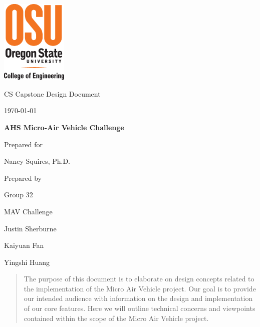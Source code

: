 \documentclass[onecolumn, draftclsnofoot,10pt, compsoc]{IEEEtran}
\def \CapstoneTeamName{		MAV Challenge}
\def \CapstoneTeamNumber{		32}
\def \GroupMemberOne{			Justin Sherburne}
\def \GroupMemberTwo{			Kaiyuan Fan}
\def \GroupMemberThree{			Yingshi Huang}
\def \CapstoneProjectName{		AHS Micro-Air Vehicle Challenge}
\def \CapstoneSponsorPerson{		Nancy Squires, Ph.D.}
\def \DocType{		%
				Design Document
				}
\newcommand{\NameSigPair}[1]{\par
\makebox[2.75in][r]{#1} \hfil 	\makebox[3.25in]{\makebox[2.25in]{\hrulefill} \hfill		\makebox[.75in]{\hrulefill}}
\par\vspace{-12pt} \textit{\tiny\noindent
\makebox[2.75in]{} \hfil		\makebox[3.25in]{\makebox[2.25in][r]{Signature} \hfill	\makebox[.75in][r]{Date}}}}
\renewcommand{\NameSigPair}[1]{#1}
\begin{document}
\begin{titlepage}
    \begin{singlespace}
    	\includegraphics[height=4cm]{coe_v_spot1}
        \hfill 
        \par\vspace{.2in}
        \centering
        \scshape{
            \huge CS Capstone \DocType \par
            {\large\today}\par
            \vspace{8pt}
            \textbf{\Huge\CapstoneProjectName}\par
			\vspace{1.5in}
            {\large Prepared for}\par
            {\Large\NameSigPair{\CapstoneSponsorPerson}\par}
			\vspace{3pt}
            {\large Prepared by }\par
            Group\CapstoneTeamNumber\par
            \CapstoneTeamName\par 
            \vspace{8pt}
            {\Large
                \NameSigPair{\GroupMemberOne}\par
                \NameSigPair{\GroupMemberTwo}\par
                \NameSigPair{\GroupMemberThree}\par
            }
            \vspace{.5in}
        }
        \begin{abstract}
        The purpose of this document is to elaborate on design concepts related to the implementation of the Micro Air Vehicle project. Our goal is to provide our intended audience with information on the design and implementation of our core features. Here we will outline technical concerns and viewpoints contained within the scope of the Micro Air Vehicle project. 
        \end{abstract}     
    \end{singlespace}
\end{titlepage}
\newpage
{}
\tableofcontents
\listoffigures
\clearpage
\end{document}
